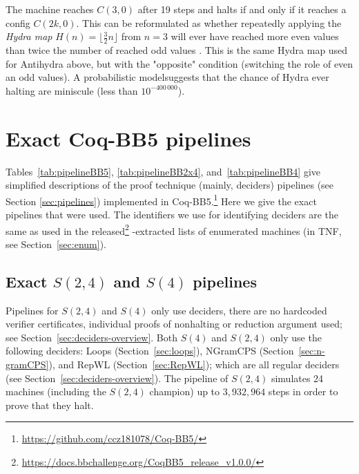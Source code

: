 \documentclass[a4paper,british]{article}
\theoremstyle{definition} %
\numberwithin{equation}{section}
\theoremstyle{definition} %
\newcommand{\CoqBB}{Coq-BB5\xspace}
\begin{document}
\begin{itemize}
          The machine reaches $C(3,0)$ after 19 steps and halts if and only if it reaches a config $C(2k,0)$. This can be reformulated as whether repeatedly applying the \textit{Hydra map} $H(n) = \lfloor \frac{3}{2}n\rfloor$ from $n=3$ will ever have reached more even values than twice the number of reached odd values \cite{ligocki2024bb25}. This is the same Hydra map used for Antihydra above, but with the "opposite" condition (switching the role of even an odd values). A probabilistic model suggests that the chance of Hydra ever halting are miniscule (less than $10^{-400\,000}$).

\end{itemize}

\newpage
\section{Exact \CoqBB pipelines}\label{app:pipelines}


Tables~\ref{tab:pipelineBB5}, \ref{tab:pipelineBB2x4}, and~\ref{tab:pipelineBB4} give simplified descriptions of the proof technique (mainly, deciders) pipelines (see Section \ref{sec:pipelines}) implemented in \CoqBB.\footnote{\url{https://github.com/ccz181078/Coq-BB5/}} Here we give the exact pipelines that were used. The identifiers we use for identifying deciders are the same as used in the released\footnote{\url{https://docs.bbchallenge.org/CoqBB5_release_v1.0.0/}} \Coq-extracted lists of enumerated machines (in TNF, see Section~\ref{sec:enum}).

\subsection{Exact $S(2,4)$ and $S(4)$ pipelines}

Pipelines for $S(2,4)$ and $S(4)$ only use deciders, \ie there are no hardcoded verifier certificates, individual proofs of nonhalting or reduction argument used; see Section~\ref{sec:deciders-overview}. Both $S(4)$ and $S(2,4)$ only use the following deciders: Loops (Section~\ref{sec:loops}), NGramCPS (Section~\ref{sec:n-gramCPS}), and RepWL (Section~\ref{sec:RepWL}); which are all regular deciders (see Section~\ref{sec:deciders-overview}). The pipeline of $S(2,4)$ simulates 24 machines (including the $S(2,4)$ champion) up to $3{,}932{,}964$ steps in order to prove that they halt.
\end{document}
